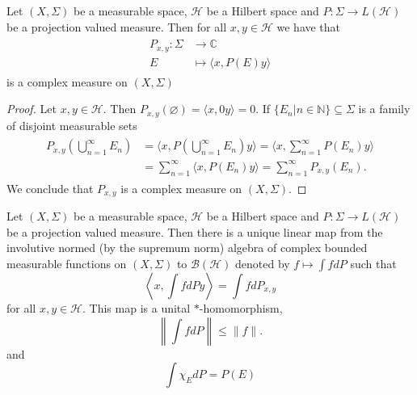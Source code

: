 \begin{theorem}
Let $(X,\Sigma)$ be a measurable space, $\mathcal{H}$ be a Hilbert space and $P:\Sigma\rightarrow L(\mathcal{H})$ be a projection valued measure. Then for all $x,y\in\mathcal{H}$ we have that
\begin{align}
\begin{split}
P_{x,y}:\Sigma&\rightarrow\mathbb{C} \\
E&\mapsto \langle x,P(E)y \rangle
\end{split}
\end{align}
is a complex measure on $(X,\Sigma)$
\end{theorem}

\begin{proof}
Let $x,y\in\mathcal{H}$. Then $P_{x,y}(\varnothing)=\langle x,0y\rangle = 0$. If $\{E_n|n\in\mathbb{N}\}\subseteq\Sigma$ is a family of disjoint measurable sets
\begin{align}
\begin{split}
P_{x,y}\left(\bigcup_{n=1}^\infty E_n\right)&=\langle x,P\left(\bigcup_{n=1}^\infty E_n\right)y\rangle =\langle x,\sum_{n=1}^\infty P(E_n)y\rangle \\
&=\sum_{n=1}^\infty\langle x, P(E_n)y\rangle=\sum_{n=1}^\infty P_{x,y}(E_n).
\end{split} 
\end{align}
We conclude that $P_{x,y}$ is a complex measure on $(X,\Sigma)$.
\end{proof}

\begin{theorem}
Let $(X,\Sigma)$ be a measurable space, $\mathcal{H}$ be a Hilbert space and $P:\Sigma\rightarrow L(\mathcal{H})$ be a projection valued measure. Then there is a unique linear map from the involutive normed (by the supremum norm) algebra of complex bounded measurable functions on $(X,\Sigma)$ to $\mathcal{B}(\mathcal{H})$ denoted by $f\mapsto\int fdP$ such that 
\begin{equation}
\left\langle x,\int fdP y\right\rangle =\int fdP_{x,y}
\end{equation} 
for all $x,y\in\mathcal{H}$. This map is a unital $*$-homomorphism,
\begin{equation}
\left\|\int f dP\right\|\leq\|f\|.
\end{equation}
and 
\begin{equation}
\int \chi_E dP=P(E)
\end{equation}
\end{theorem}


